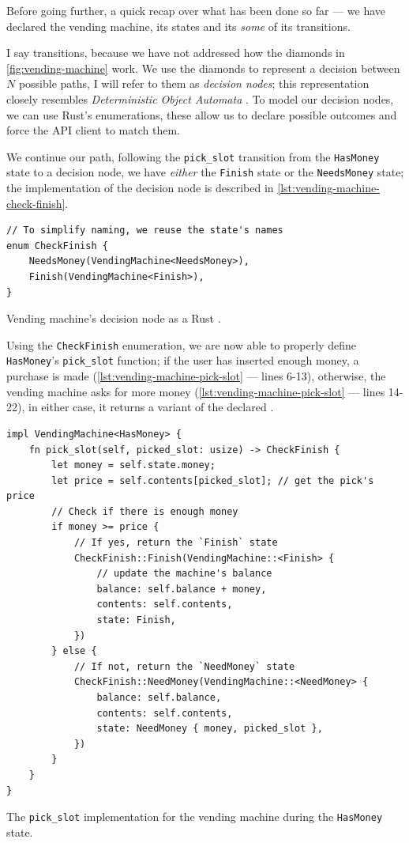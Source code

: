 Before going further, a quick recap over what has been done so far ---
we have declared the vending machine, its states and its \emph{some} of its transitions.

I say  transitions, because we have not addressed how the diamonds in \autoref{fig:vending-machine} work.
We use the diamonds to represent a decision between $N$ possible paths, I will refer to them as \emph{decision nodes};
this representation closely resembles \emph{Deterministic Object Automata} \cite{Trindade2020}.
To model our decision nodes, we can use Rust's enumerations,
these allow us to declare possible outcomes and force the \gls{API} client to match them.

We continue our path, following the \texttt{pick\_slot} transition from the \texttt{HasMoney} state to a decision node,
we have \emph{either} the \texttt{Finish} state or the \texttt{NeedsMoney} state;
the implementation of the decision node is described in \autoref{lst:vending-machine-check-finish}.

\begin{listing}
    \begin{verbatim}
// To simplify naming, we reuse the state's names
enum CheckFinish {
    NeedsMoney(VendingMachine<NeedsMoney>),
    Finish(VendingMachine<Finish>),
}
\end{verbatim}
    \caption{Vending machine's decision node as a Rust .}
    \label{lst:vending-machine-check-finish}
\end{listing}

Using the \texttt{CheckFinish} enumeration, we are now able to properly define \texttt{HasMoney}'s \texttt{pick\_slot} function;
if the user has inserted enough money, a purchase is made (\autoref{lst:vending-machine-pick-slot} --- lines 6-13),
otherwise, the vending machine asks for more money (\autoref{lst:vending-machine-pick-slot} --- lines 14-22),
in either case, it returns a variant of the declared .

\begin{listing}
    \begin{verbatim}
impl VendingMachine<HasMoney> {
    fn pick_slot(self, picked_slot: usize) -> CheckFinish {
        let money = self.state.money;
        let price = self.contents[picked_slot]; // get the pick's price
        // Check if there is enough money
        if money >= price {
            // If yes, return the `Finish` state
            CheckFinish::Finish(VendingMachine::<Finish> {
                // update the machine's balance
                balance: self.balance + money,
                contents: self.contents,
                state: Finish,
            })
        } else {
            // If not, return the `NeedMoney` state
            CheckFinish::NeedMoney(VendingMachine::<NeedMoney> {
                balance: self.balance,
                contents: self.contents,
                state: NeedMoney { money, picked_slot },
            })
        }
    }
}
\end{verbatim}
    \caption{The \texttt{pick\_slot} implementation for the vending machine during the \texttt{HasMoney} state.}
    \label{lst:vending-machine-pick-slot}
\end{listing}


